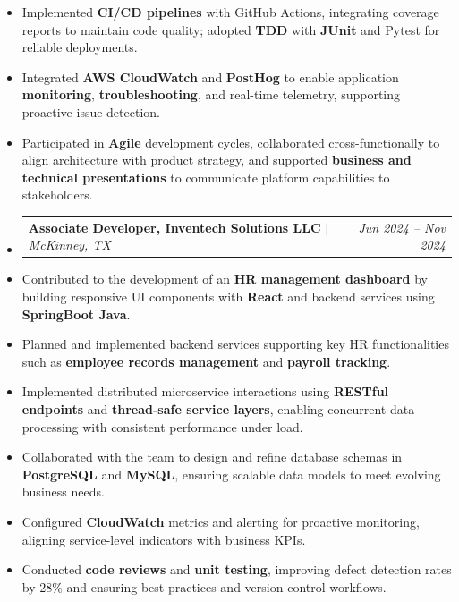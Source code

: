 \documentclass[a4paper,10pt]{article}
\makeatletter
\newcommand{\resumeSubheading}[4]{
  \vspace{-1pt}\item
    \begin{tabular*}{\linewidth}{l@{\extracolsep{\fill}}r}
      \textbf{#1} $|$ \textit{#2} & \textit{#4} \\
    \end{tabular*}\vspace{-4pt}
}
\newcommand{\textbulletlight}{\raisebox{0.15ex}{\scalebox{0.6}{$\bullet$}}}
\makeatother
\begin{document}
\begin{itemize}[leftmargin=12pt, rightmargin=0pt, label={\textbulletlight}, itemsep=0pt, topsep=2pt]
        \item Implemented \textbf{CI/CD pipelines} with GitHub Actions, integrating coverage reports to maintain code quality; adopted \textbf{TDD} with \textbf{JUnit} and Pytest for reliable deployments.
        \item Integrated \textbf{AWS CloudWatch} and \textbf{PostHog} to enable application \textbf{monitoring}, \textbf{troubleshooting}, and real-time telemetry, supporting proactive issue detection.
        \item Participated in \textbf{Agile} development cycles, collaborated cross-functionally to align architecture with product strategy, and supported \textbf{business and technical presentations} to communicate platform capabilities to stakeholders.
\end{itemize}

\vspace{-2pt}
\begin{itemize}[leftmargin=0pt, rightmargin=0pt, label={}, itemsep=0pt]
    \resumeSubheading{Associate Developer, Inventech Solutions LLC}{McKinney, TX}
    {}{Jun 2024 -- Nov 2024}
\end{itemize}\vspace{-6pt}
\begin{itemize}[leftmargin=12pt, rightmargin=0pt, label={\textbulletlight}, itemsep=0pt, topsep=2pt]
        \item \small Contributed to the development of an \textbf{HR management dashboard} by building responsive UI components with \textbf{React} and backend services using \textbf{SpringBoot Java}.
        \item Planned and implemented backend services supporting key HR functionalities such as \textbf{employee records management} and \textbf{payroll tracking}.
        \item Implemented distributed microservice interactions using \textbf{RESTful endpoints} and \textbf{thread-safe service layers}, enabling concurrent data processing with consistent performance under load.
        \item Collaborated with the team to design and refine database schemas in \textbf{PostgreSQL} and \textbf{MySQL}, ensuring scalable data models to meet evolving business needs.
        \item Configured \textbf{CloudWatch} metrics and alerting for proactive monitoring, aligning service-level indicators with business KPIs.
        \item Conducted \textbf{code reviews} and \textbf{unit testing}, improving defect detection rates by 28\% and ensuring best practices and version control workflows.
\end{itemize}
\end{document}

